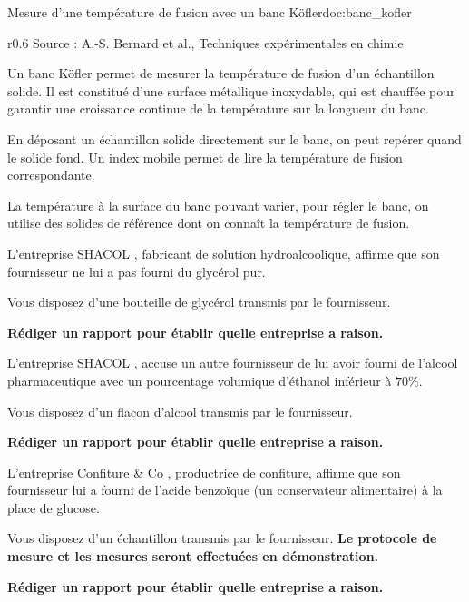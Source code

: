 \begin{doc}{Mesure d'une température de fusion avec un banc Köfler}{doc:banc_kofler}
  \begin{wrapfigure}[11]{r}{0.6\linewidth}
    \centering
    {\scriptsize Source : A.-S. Bernard et al., Techniques expérimentales en chimie}
  \end{wrapfigure}
  
  Un banc Köfler permet de mesurer la température de fusion d'un échantillon solide.
  Il est constitué d'une surface métallique inoxydable, qui est chauffée pour garantir une croissance continue de la température sur la longueur du banc.
  
  En déposant un échantillon solide directement sur le banc, on peut repérer quand le solide fond.
  Un index mobile permet de lire la température de fusion correspondante.
  
  La température à la surface du banc pouvant varier, pour régler le banc, on utilise des solides de référence dont on connaît la température de fusion.
\end{doc}



L'entreprise \og SHACOL \fg, fabricant de solution hydroalcoolique, affirme que son fournisseur ne lui a pas fourni du glycérol pur.

Vous disposez d'une bouteille de glycérol transmis par le fournisseur.

\begin{center}
\textbf{Rédiger un rapport pour établir quelle entreprise a raison.}
\end{center}



L'entreprise \og SHACOL \fg, accuse un autre fournisseur de lui avoir fourni de l'alcool pharmaceutique avec un pourcentage volumique d'éthanol inférieur à $70 \%$.

Vous disposez d'un flacon d'alcool transmis par le fournisseur.

\begin{center}
\textbf{Rédiger un rapport pour établir quelle entreprise a raison.}
\end{center}



L'entreprise \og Confiture \& Co \fg, productrice de confiture, affirme que son fournisseur lui a fourni de l'acide benzoïque (un conservateur alimentaire) à la place de glucose.

Vous disposez d'un échantillon transmis par le fournisseur. \textbf{Le protocole de mesure et les mesures seront effectuées en démonstration.}

\begin{center}
\textbf{Rédiger un rapport pour établir quelle entreprise a raison.}
\end{center}